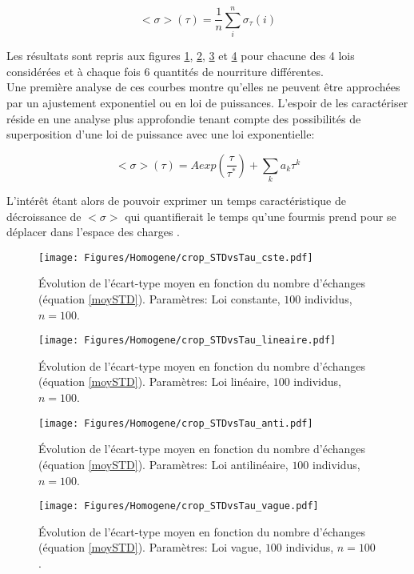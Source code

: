 \begin{equation}
<\sigma>(\tau)=\frac{1}{n}\sum_i^n \sigma_{\tau}(i)
\label{moySTD}
\end{equation}

Les résultats sont repris aux figures \ref{ergo_cste_STD}, \ref{ergo_lineaire_STD}, \ref{ergo_anti_STD} et \ref{ergo_vague_STD} pour chacune des 4 lois considérées et à chaque fois 6 quantités de nourriture différentes.\\


Une première analyse de ces courbes montre qu'elles ne peuvent être approchées par un ajustement exponentiel ou en loi de puissances. L'espoir de les caractériser réside en une analyse plus approfondie tenant compte des possibilités de superposition d'une loi de puissance avec une loi exponentielle:

\begin{equation}
<\sigma>(\tau)=A exp(\frac{\tau}{\tau^*}) + \sum_k a_k \tau^k
\end{equation}

L'intérêt étant alors de pouvoir exprimer un temps caractéristique de décroissance de $<\sigma>$ qui quantifierait le temps qu'une fourmis prend pour se déplacer dans l'espace des charges .\\

\begin{figure}[h]
\centering
\texttt{[image: Figures/Homogene/crop\_STDvsTau\_cste.pdf]}
\caption{Évolution de l'écart-type moyen en fonction du nombre d'échanges (équation \ref{moySTD}). Paramètres: Loi constante, $100$ individus, $n=100$.}
\label{ergo_cste_STD}
\end{figure}

\begin{figure}[h]
\centering
\texttt{[image: Figures/Homogene/crop\_STDvsTau\_lineaire.pdf]}
\caption{Évolution de l'écart-type moyen en fonction du nombre d'échanges (équation \ref{moySTD}). Paramètres: Loi linéaire, $100$ individus, $n=100$.}
\label{ergo_lineaire_STD}
\end{figure}

\begin{figure}[h]
\centering
\texttt{[image: Figures/Homogene/crop\_STDvsTau\_anti.pdf]}
\caption{Évolution de l'écart-type moyen en fonction du nombre d'échanges (équation \ref{moySTD}). Paramètres: Loi antilinéaire, $100$ individus, $n=100$.}
\label{ergo_anti_STD}
\end{figure}

\begin{figure}[h]
\centering
\texttt{[image: Figures/Homogene/crop\_STDvsTau\_vague.pdf]}
\caption{Évolution de l'écart-type moyen en fonction du nombre d'échanges (équation \ref{moySTD}). Paramètres: Loi vague, $100$ individus, $n=100$.}
\label{ergo_vague_STD}
\end{figure}

